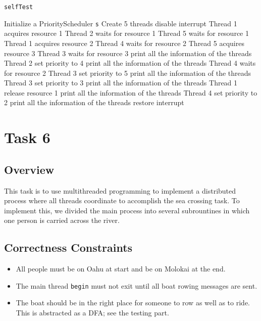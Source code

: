 \documentclass{article}
\begin{document}
\begin{spacing}{1.1}
\begin{algorithm}[htbp]
  \caption{\texttt{selfTest}}
\begin{algorithmic}[1]
  \STATE Initialize a PriorityScheduler \texttt{s}
  \STATE Create 5 threads
  \STATE disable interrupt
  \STATE
  \STATE Thread 1 acquires resource 1
  \STATE Thread 2 waits for resource 1
  \STATE Thread 5 waits for resource 1
  \STATE Thread 1 acquires resource 2
  \STATE Thread 4 waits for resource 2
  \STATE Thread 5 acquires resource 3
  \STATE Thread 3 waits for resource 3
  \STATE print all the information of the threads
  \STATE
  \STATE Thread 2 set priority to 4
  \STATE print all the information of the threads
  \STATE
  \STATE Thread 4 waits for resource 2
  \STATE Thread 3 set priority to 5
  \STATE print all the information of the threads
  \STATE
  \STATE Thread 3 set priority to 3
  \STATE print all the information of the threads
  \STATE
  \STATE Thread 1 release resource 1
  \STATE print all the information of the threads
  \STATE
  \STATE Thread 4 set priority to 2
  \STATE print all the information of the threads
  \STATE
  \STATE restore interrupt
\end{algorithmic}
\end{algorithm}


\section{Task 6}
\subsection{Overview}
This task is to use multithreaded programming to implement a distributed process where all threads coordinate to accomplish the sea crossing task. To implement this, we divided the main process into several subrountines in which one person is carried across the river.

\subsection{Correctness Constraints}
\begin{itemize}
  \item All people must be on Oahu at start and be on Molokai at the end.
  \item The main thread \texttt{begin} must not exit until all boat rowing messages are sent.
  \item The boat should be in the right place for someone to row as well as to ride. This is abstracted as a DFA; see the testing part.
\end{itemize}

\end{spacing}
\end{document}
